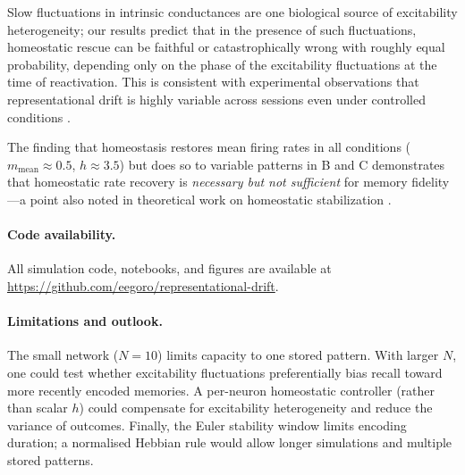 \documentclass[11pt,a4paper]{article}
\begin{document}
Slow fluctuations in intrinsic conductances \citep{Delamare2023} are one
biological source of excitability heterogeneity; our results predict that
in the presence of such fluctuations, homeostatic rescue can be faithful or
catastrophically wrong with roughly equal probability, depending only on
the phase of the excitability fluctuations at the time of reactivation.
This is consistent with experimental observations that representational drift
is highly variable across sessions even under controlled conditions \citep{Bauer2024}.

The finding that homeostasis restores mean firing rates in all conditions
($m_\mathrm{mean}\approx0.5$, $h\approx3.5$) but does so to variable patterns
in B and C demonstrates that homeostatic rate recovery is \emph{necessary but
not sufficient} for memory fidelity---a point also noted in theoretical work
on homeostatic stabilization \citep{DarshanRivkind2022}.

\paragraph{Code availability.}
All simulation code, notebooks, and figures are available at
\url{https://github.com/eegoro/representational-drift}.

\paragraph{Limitations and outlook.}
The small network ($N=10$) limits capacity to one stored pattern.  With larger
$N$, one could test whether excitability fluctuations preferentially bias recall
toward more recently encoded memories.  A per-neuron homeostatic controller
(rather than scalar $h$) could compensate for excitability heterogeneity and
reduce the variance of outcomes.  Finally, the Euler stability window limits
encoding duration; a normalised Hebbian rule \citep{Qin2023} would allow longer
simulations and multiple stored patterns.

\clearpage


\end{document}
